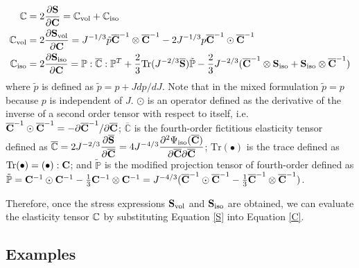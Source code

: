 \begin{subequations} 
\label{C}
\begin{align}
\mathbb{C} &= 2\frac{\partial{\bold{S}}}{\partial{\bold{C}}} = \mathbb{C}_\mathrm{vol} + \mathbb{C}_\mathrm{iso} 
\label{Ctotal} \\
\mathbb{C}_\mathrm{vol} &= 2\frac{\partial{\bold{S}_\mathrm{vol}}}{\partial{\bold{C}}} =
J^{-1/3}\tilde{p}{\overline{\bold{C}}}^{-1}\otimes {\overline{\bold{C}}}^{-1} - 2J^{-1/3}p{\overline{\bold{C}}}^{-1}\odot {\overline{\bold{C}}}^{-1}  \label{Cvol} \\
\mathbb{C}_\mathrm{iso} &= 2\frac{\partial{\bold{S}_\mathrm{iso}}}{\partial{\bold{C}}} =
\mathbb{P} : \overline{\mathbb{C}} : \mathbb{P}^T + \frac{2}{3}\mathrm{Tr}(J^{-2/3}\overline{\bold{S}})\tilde{\mathbb{P}} - \frac{2}{3}J^{-2/3}(\overline{\bold{C}}^{-1}\otimes\bold{S}_\mathrm{iso} + \bold{S}_\mathrm{iso}\otimes {\overline{\bold{C}}}^{-1})
\label{Ciso} 
\end{align}
\end{subequations}
where $\tilde{p}$ is defined as $\tilde{p} = p + J{dp}/{dJ}$. Note that in the mixed formulation $\tilde{p} = p$ because $p$ is independent of $J$. $\odot$ is an operator defined as the derivative of the inverse of a second order tensor with respect to itself, i.e. 
${\overline{\bold{C}}}^{-1}\odot {\overline{\bold{C}}}^{-1} = - {\partial{{\overline{\bold{C}}}^{-1}}} / {\partial{{\overline{\bold{C}}}}}$; 
$\overline{\mathbb{C}}$ is the fourth-order fictitious elasticity tensor defined as 
$\overline{\mathbb{C}} = 2J^{-2/3}\dfrac{\partial{\overline{\bold{S}}}}{\partial{\overline{\bold{C}}}} = 4J^{-4/3} \dfrac{\partial^2\Psi_\mathrm{iso}(\overline{\bold{C}})} {\partial{\overline{\bold{C}}}{\partial{\overline{\bold{C}}}}} $;
$\mathrm{Tr}(\bullet)$ is the trace defined as $\mathrm{Tr}(\bullet) = (\bullet) : \bold{C}$;
and $\tilde{\mathbb{P}}$ is the modified projection tensor of fourth-order defined as 
$\tilde{\mathbb{P}} = \bold{C}^{-1} \odot \bold{C}^{-1} -  \frac{1}{3}\bold{C}^{-1} \otimes \bold{C}^{-1} = J^{-4/3}(
{\overline{\bold{C}}}^{-1} \odot {\overline{\bold{C}}}^{-1} -  \frac{1}{3} {\overline{\bold{C}}}^{-1} \otimes {\overline{\bold{C}}}^{-1})$.

Therefore, once the stress expressions $\bold{S}_\mathrm{vol}$ and $\bold{S}_\mathrm{iso}$ are obtained, we can evaluate the elasticity tensor $\mathbb{C}$ by substituting Equation \ref{S} into Equation \ref{C}.

%
\subsection {Examples}
